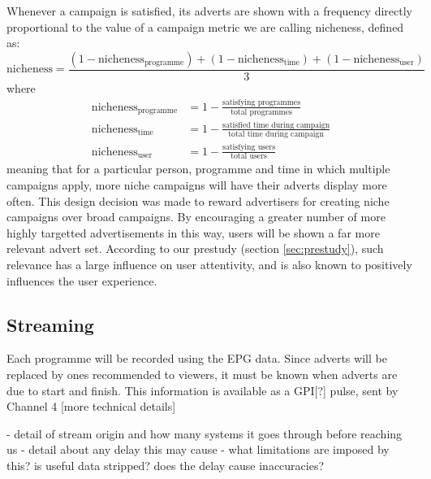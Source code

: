 Whenever a campaign is satisfied, its adverts are shown with a frequency directly proportional to the value of a campaign metric we are calling nicheness, defined as:
$$
	\text{nicheness} = \frac{(1-\text{nicheness}_\text{programme}) + (1-\text{nicheness}_\text{time}) + (1-\text{nicheness}_\text{user})}{3}
$$
where
\begin{align*}
	\text{nicheness}_\text{programme} &= 1 - \frac{\text{satisfying programmes}}{\text{total programmes}} \\
	\text{nicheness}_\text{time} &= 1 - \frac{\text{satisfied time during campaign}}{\text{total time during campaign}} \\
	\text{nicheness}_\text{user} &= 1 - \frac{\text{satisfying users}}{\text{total users}}
\end{align*}
meaning that for a particular person, programme and time in which multiple campaigns apply, more niche campaigns will have their adverts display more often. This design decision was made to reward advertisers for creating niche campaigns over broad campaigns. By encouraging a greater number of more highly targetted advertisements in this way, users will be shown a far more relevant advert set.
According to our prestudy (section \ref{sec:prestudy}), such relevance has a large influence on user attentivity, and is also known to positively influences the user experience\cite{yahoo-intrusive-advertising}.

\subsection{Streaming}
Each programme will be recorded using the EPG data. Since adverts will be replaced by ones recommended to viewers, it must be known when adverts are due to start and finish. This information is available as a GPI[?] pulse, sent by Channel 4 [more technical details]

- detail of stream origin and how many systems it goes through before reaching us
- detail about any delay this may cause
- what limitations are imposed by this? is useful data stripped? does the delay cause inaccuracies?

